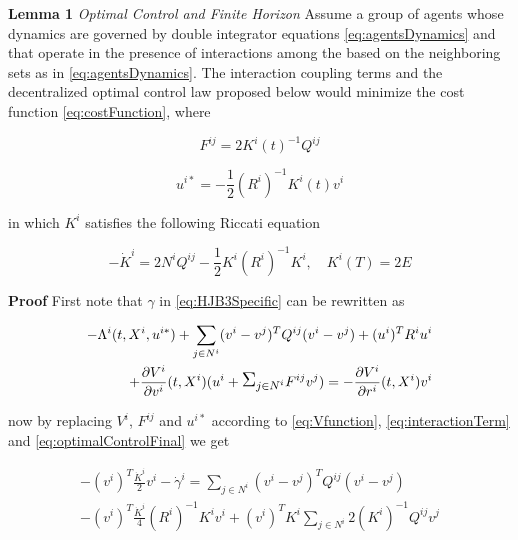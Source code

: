 \documentclass[conference]{IEEEtran}
\begin{document}
\textbf{Lemma 1} \textit{Optimal Control and Finite Horizon} Assume a group of agents whose dynamics are governed by double integrator equations \ref{eq:agentsDynamics} and that operate in the presence of interactions among the based on the neighboring sets as in \ref{eq:agentsDynamics}. The interaction coupling terms and the decentralized optimal control law proposed below would minimize the cost function \ref{eq:costFunction}, where

\begin{equation}\label{eq:interactionTerm}
F^{ij}=2K^{i}(t)^{-1}Q^{ij}
\end{equation}

\begin{equation}\label{eq:optimalControlFinal}
u^{i*}=-\frac{1}{2}(R^{i})^{-1}K^{i}(t)v^{i}
\end{equation}

in which $K^{i}$ satisfies the following Riccati equation

\begin{equation}\label{eq:riccati}
-\dot{K}^{i}=2N^{i}Q^{ij}-\frac{1}{2}K^{i}(R^{i})^{-1}K^{i}, \quad K^{i}(T)=2E
\end{equation}

\textbf{Proof} First note that $\gamma$ in \ref{eq:HJB3Specific} can be rewritten as

\begin{equation}\label{eq:HJB3SpecificRewritten}
\begin{split}
-\Lambda^{i}(t,X^{i},u^{i*})+\sum_{j \in N^{i}}(v^{i}-v^{j})^{T}Q^{ij}(v^{i}-v^{j})+(u^{i})^{T}R^{i}u^{i}\\
+\frac{\partial V^{i}}{\partial v^{i}}(t,X^{i})(u^{i}+\mathlarger{\mathlarger{\Sigma}}_{j \in N^{i}} F^{ij}v^{j})=-
\frac{\partial V^{i}}{\partial r^{i}}(t,X^{i})v^{i}
\end{split}
\end{equation}

now by replacing $V^{i}$, $F^{ij}$ and $u^{i*}$ according to \ref{eq:Vfunction}, \ref{eq:interactionTerm} and \ref{eq:optimalControlFinal} we get

\begin{equation}\label{eq:proof1}
\begin{split}
-(v^{i})^{T}\frac{\dot{K}^{i}}{2}v^{i}-\dot{\gamma}^{i}=\sum_{j \in N^{i}}(v^{i}-v^{j})^{T}Q^{ij}(v^{i}-v^{j})\\
-(v^{i})^{T}\frac{\dot{K}^{i}}{4}(R^{i})^{-1}K^{i}v^{i}+(v^{i})^{T}K^{i}\sum_{j \in N^{i}}2(K^{i})^{-1}Q^{ij}v^{j}
\end{split}
\end{equation}
\end{document}
